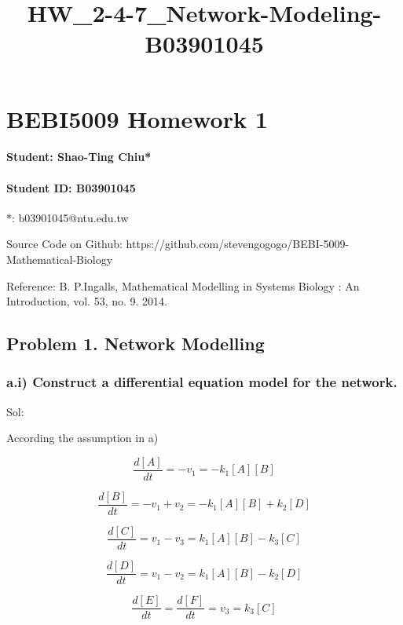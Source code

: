 \documentclass[11pt]{article}
\title{HW\_2-4-7\_Network-Modeling-B03901045}
\begin{document}
    
    
    \maketitle
    
    

    
    \section{BEBI5009 Homework 1}\label{bebi5009-homework-1}

\paragraph{Student: Shao-Ting Chiu*}\label{student-shao-ting-chiu}

    \paragraph{Student ID: B03901045}\label{student-id-b03901045}

    *: b03901045@ntu.edu.tw

    Source Code on Github:
https://github.com/stevengogogo/BEBI-5009-Mathematical-Biology

    Reference: B. P.Ingalls, Mathematical Modelling in Systems Biology : An
Introduction, vol. 53, no. 9. 2014.

    \subsection{Problem 1. Network
Modelling}\label{problem-1.-network-modelling}

    \subsubsection{a.i) Construct a differential equation model for the
network.}\label{a.i-construct-a-differential-equation-model-for-the-network.}

Sol:

According the assumption in a)

\[\frac{d[A]}{dt}=-v_{1}=-k_{1}[A][B]\]

\[\frac{d[B]}{dt}=-v_{1}+v_{2}=-k_{1}[A][B]+k_{2}[D]\]

\[\frac{d[C]}{dt}=v_{1}-v_{3}=k_{1}[A][B]-k_{3}[C] \]

\[\frac{d[D]}{dt}=v_{1}-v_{2}=k_{1}[A][B]-k_{2}[D]\]

\[\frac{d[E]}{dt}=\frac{d[F]}{dt}=v_{3}=k_{3}[C] \]
\end{document}
